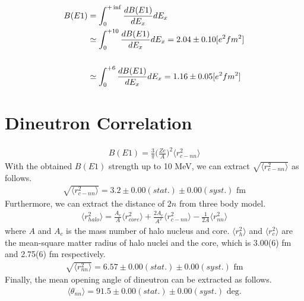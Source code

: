 \begin{align}
    B(E1) &= \int_{0}^{+\inf} \frac{dB(E1)}{dE_x} dE_x \\
          &\simeq \int_{0}^{+10} \frac{dB(E1)}{dE_x} dE_x = 2.04 \pm 0.10  [e^{2}fm^{2}] \\
          \\ \notag
          &\simeq \int_{0}^{+6} \frac{dB(E1)}{dE_x} dE_x = 1.16 \pm 0.05  [e^{2}fm^{2}] \\    
\end{align}  

\section{Dineutron Correlation}

\begin{align}
    B(E1) = \frac{3}{\pi} \bigg( \frac{Ze}{A} \bigg)^2 \langle r^{2}_{c-nn} \rangle
\end{align}
With the obtained $B(E1)$ strength up to 10 MeV, we can extract $\sqrt{ \langle r^{2}_{c-nn} \rangle}$ as follows.
\begin{align}
    \sqrt{ \langle r^{2}_{c-nn} \rangle} = 3.2 \pm 0.00 (stat.) \pm 0.00 (syst.) \text{ fm}
\end{align}
Furthermore, we can extract the distance of $2n$ from three body model.
\begin{align}
    \langle r^{2}_{halo} \rangle = \frac{A_c}{A} \langle r^{2}_{core} \rangle + \frac{2A_c}{A^2} \langle r^{2}_{c-nn} \rangle - \frac{1}{2A} \langle r^{2}_{nn} \rangle
\end{align}
where $A$ and $A_c$ is the mass number of halo nucleus and core. $\langle r^{2}_{h} \rangle$ and $\langle r^{2}_{c} \rangle$ are the mean-square matter radius of halo nuclei and the core, which is 3.00(6) fm and 2.75(6) fm respectively.
\begin{align}
    \sqrt{ \langle r^{2}_{nn} \rangle} = 6.57 \pm 0.00 (stat.) \pm 0.00 (syst.) \text{ fm}
\end{align}
Finally, the mean opening angle of dineutron can be extracted as follows.
\begin{align}
    \langle \theta_{nn} \rangle = 91.5 \pm 0.00 (stat.) \pm 0.00 (syst.) \text{ deg.}
\end{align}